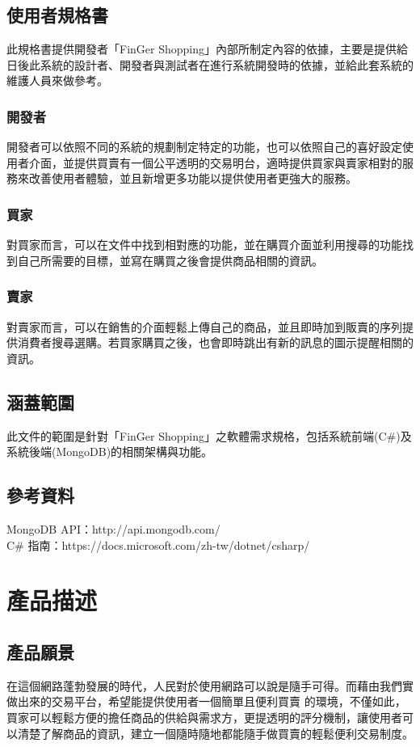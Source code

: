 \documentclass{scrreprt}
\begin{document}
\begin{CJK}{UTF8}{bkai}
\section{使用者規格書}
\qquad 此規格書提供開發者「FinGer Shopping」內部所制定內容的依據，主要是提供給日後此系統的設計者、開發者與測試者在進行系統開發時的依據，並給此套系統的維護人員來做參考。

\subsection{開發者}
\qquad 開發者可以依照不同的系統的規劃制定特定的功能，也可以依照自己的喜好設定使用者介面，並提供買賣有一個公平透明的交易明台，適時提供買家與賣家相對的服務來改善使用者體驗，並且新增更多功能以提供使用者更強大的服務。

\subsection{買家}
\qquad 對買家而言，可以在文件中找到相對應的功能，並在購買介面並利用搜尋的功能找到自己所需要的目標，並寫在購買之後會提供商品相關的資訊。

\subsection{賣家}
\qquad 對賣家而言，可以在銷售的介面輕鬆上傳自己的商品，並且即時加到販賣的序列提供消費者搜尋選購。若買家購買之後，也會即時跳出有新的訊息的圖示提醒相關的資訊。

\section{涵蓋範圍}
\qquad 此文件的範圍是針對「FinGer Shopping」之軟體需求規格，包括系統前端(C\#)及系統後端(MongoDB)的相關架構與功能。

\section{參考資料}
MongoDB API：http://api.mongodb.com/ \\
C\# 指南：https://docs.microsoft.com/zh-tw/dotnet/csharp/ \\


\chapter{產品描述}

\section{產品願景}
\qquad 在這個網路蓬勃發展的時代，人民對於使用網路可以說是隨手可得。而藉由我們實做出來的交易平台，希望能提供使用者一個簡單且便利買賣
的環境，不僅如此，買家可以輕鬆方便的擔任商品的供給與需求方，更提透明的評分機制，讓使用者可以清楚了解商品的資訊，建立一個隨時隨地都能隨手做買賣的輕鬆便利交易制度。


\end{CJK}
\end{document}
